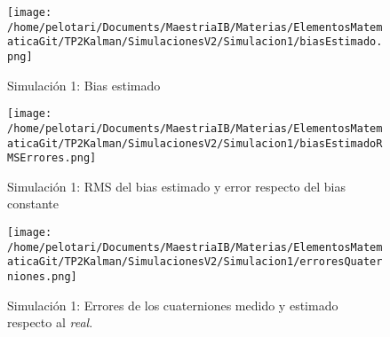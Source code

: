 \documentclass[a4paper,11pt,twoside]{IT-CNEA}
\begin{document}
\begin{figure}[h!]
\centering
\texttt{[image: /home/pelotari/Documents/MaestriaIB/Materias/ElementosMatematicaGit/TP2Kalman/SimulacionesV2/Simulacion1/biasEstimado.png]}
\caption{Simulación 1: Bias estimado}
\label{fig:Simulacion1/biasEstimado}
\end{figure}
\begin{figure}[h!]
\centering
\texttt{[image: /home/pelotari/Documents/MaestriaIB/Materias/ElementosMatematicaGit/TP2Kalman/SimulacionesV2/Simulacion1/biasEstimadoRMSErrores.png]}
\caption{Simulación 1: RMS del bias estimado y error respecto del bias constante}
\label{fig:Simulacion1/biasEstimadoRMSErrores}
\end{figure}
\begin{figure}[h!]
\centering
\texttt{[image: /home/pelotari/Documents/MaestriaIB/Materias/ElementosMatematicaGit/TP2Kalman/SimulacionesV2/Simulacion1/erroresQuaterniones.png]}
\caption{Simulación 1: Errores de los cuaterniones medido y estimado respecto al \textit{real}.}
\label{fig:Simulacion1/erroresQuaterniones}
\end{figure}
\end{document}
